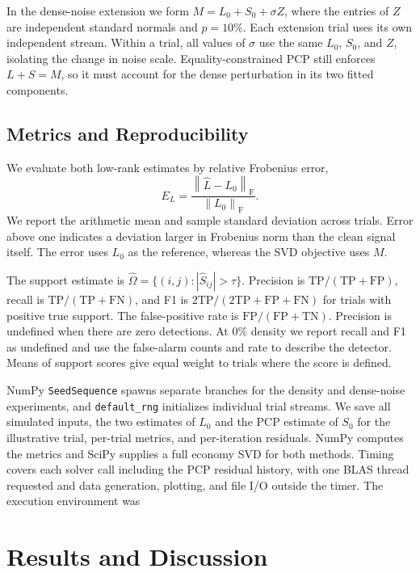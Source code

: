 \documentclass[conference]{IEEEtran}
\newcommand{\fro}[1]{\left\|#1\right\|_{\mathrm F}}
\begin{document}
In the dense-noise extension we form $M=L_0+S_0+\sigma Z$, where the entries of $Z$ are independent standard normals and $p=10\%$. Each extension trial uses its own independent stream. Within a trial, all values of $\sigma$ use the same $L_0$, $S_0$, and $Z$, isolating the change in noise scale. Equality-constrained PCP still enforces $L+S=M$, so it must account for the dense perturbation in its two fitted components.

\subsection{Metrics and Reproducibility}
We evaluate both low-rank estimates by relative Frobenius error,
\begin{equation}
  E_L=\frac{\fro{\hat L-L_0}}{\fro{L_0}}.
  \label{eq:relative_error}
\end{equation}
We report the arithmetic mean and sample standard deviation across trials. Error above one indicates a deviation larger in Frobenius norm than the clean signal itself. The error uses $L_0$ as the reference, whereas the SVD objective uses $M$.

The support estimate is $\hat\Omega=\{(i,j):|\hat S_{ij}|>\tau\}$. Precision is $\mathrm{TP}/(\mathrm{TP}+\mathrm{FP})$, recall is $\mathrm{TP}/(\mathrm{TP}+\mathrm{FN})$, and F1 is $2\mathrm{TP}/(2\mathrm{TP}+\mathrm{FP}+\mathrm{FN})$ for trials with positive true support. The false-positive rate is $\mathrm{FP}/(\mathrm{FP}+\mathrm{TN})$. Precision is undefined when there are zero detections. At 0\% density we report recall and F1 as undefined and use the false-alarm counts and rate to describe the detector. Means of support scores give equal weight to trials where the score is defined.

NumPy \texttt{SeedSequence} spawns separate branches for the density and dense-noise experiments, and \texttt{default\_rng} initializes individual trial streams. We save all simulated inputs, the two estimates of $L_0$ and the PCP estimate of $S_0$ for the illustrative trial, per-trial metrics, and per-iteration residuals. NumPy computes the metrics and SciPy supplies a full economy SVD for both methods. Timing covers each solver call including the PCP residual history, with one BLAS thread requested and data generation, plotting, and file I/O outside the timer. The execution environment was \Environment{}

\section{Results and Discussion}
\end{document}
